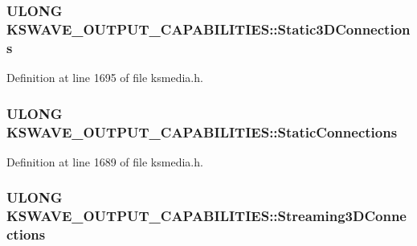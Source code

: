 \subsubsection[{\texorpdfstring{Static3\+D\+Connections}{Static3DConnections}}]{\setlength{\rightskip}{0pt plus 5cm}U\+L\+O\+NG K\+S\+W\+A\+V\+E\+\_\+\+O\+U\+T\+P\+U\+T\+\_\+\+C\+A\+P\+A\+B\+I\+L\+I\+T\+I\+E\+S\+::\+Static3\+D\+Connections}\hypertarget{struct_k_s_w_a_v_e___o_u_t_p_u_t___c_a_p_a_b_i_l_i_t_i_e_s_a1ea5f96f463a7b80583df651d0354748}{}\label{struct_k_s_w_a_v_e___o_u_t_p_u_t___c_a_p_a_b_i_l_i_t_i_e_s_a1ea5f96f463a7b80583df651d0354748}


Definition at line 1695 of file ksmedia.\+h.

\subsubsection[{\texorpdfstring{Static\+Connections}{StaticConnections}}]{\setlength{\rightskip}{0pt plus 5cm}U\+L\+O\+NG K\+S\+W\+A\+V\+E\+\_\+\+O\+U\+T\+P\+U\+T\+\_\+\+C\+A\+P\+A\+B\+I\+L\+I\+T\+I\+E\+S\+::\+Static\+Connections}\hypertarget{struct_k_s_w_a_v_e___o_u_t_p_u_t___c_a_p_a_b_i_l_i_t_i_e_s_af132ce42ee9e7417f7a105af02596dfb}{}\label{struct_k_s_w_a_v_e___o_u_t_p_u_t___c_a_p_a_b_i_l_i_t_i_e_s_af132ce42ee9e7417f7a105af02596dfb}


Definition at line 1689 of file ksmedia.\+h.

\subsubsection[{\texorpdfstring{Streaming3\+D\+Connections}{Streaming3DConnections}}]{\setlength{\rightskip}{0pt plus 5cm}U\+L\+O\+NG K\+S\+W\+A\+V\+E\+\_\+\+O\+U\+T\+P\+U\+T\+\_\+\+C\+A\+P\+A\+B\+I\+L\+I\+T\+I\+E\+S\+::\+Streaming3\+D\+Connections}\hypertarget{struct_k_s_w_a_v_e___o_u_t_p_u_t___c_a_p_a_b_i_l_i_t_i_e_s_a9a3bbef7dfa276490e5813a5aca2cea9}{}\label{struct_k_s_w_a_v_e___o_u_t_p_u_t___c_a_p_a_b_i_l_i_t_i_e_s_a9a3bbef7dfa276490e5813a5aca2cea9}



